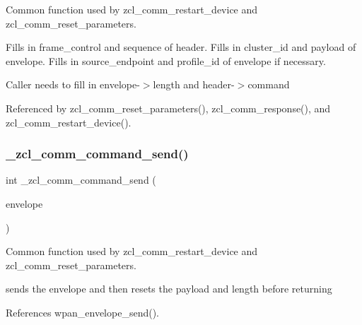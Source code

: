 Common function used by zcl\+\_\+comm\+\_\+restart\+\_\+device and zcl\+\_\+comm\+\_\+reset\+\_\+parameters. 

Fills in frame\+\_\+control and sequence of header. Fills in cluster\+\_\+id and payload of envelope. Fills in source\+\_\+endpoint and profile\+\_\+id of envelope if necessary.

Caller needs to fill in envelope-\/$>$length and header-\/$>$command 

Referenced by zcl\+\_\+comm\+\_\+reset\+\_\+parameters(), zcl\+\_\+comm\+\_\+response(), and zcl\+\_\+comm\+\_\+restart\+\_\+device().

\mbox{\label{group__zcl__commissioning_gab653d2ac290d96d3131c894f7330fbb6}} 
\subsubsection{\texorpdfstring{\+\_\+zcl\+\_\+comm\+\_\+command\+\_\+send()}{\_zcl\_comm\_command\_send()}}
{\footnotesize\ttfamily int \+\_\+zcl\+\_\+comm\+\_\+command\+\_\+send (\begin{DoxyParamCaption}\item[{\hyperlink{structwpan__envelope__t}{wpan\+\_\+envelope\+\_\+t} \hyperlink{group__hal_gaef060b3456fdcc093a7210a762d5f2ed}{F\+AR} $\ast$}]{envelope }\end{DoxyParamCaption})}



Common function used by zcl\+\_\+comm\+\_\+restart\+\_\+device and zcl\+\_\+comm\+\_\+reset\+\_\+parameters. 

sends the envelope and then resets the payload and length before returning 

References wpan\+\_\+envelope\+\_\+send().

\mbox{\label{group__zcl__commissioning_gae3180284d1a5a9af2176173a58cc1f4c}} 
